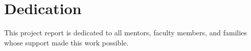 \chapter*{Dedication}

This project report is dedicated to all mentors, faculty members, and families whose support made this work possible.
